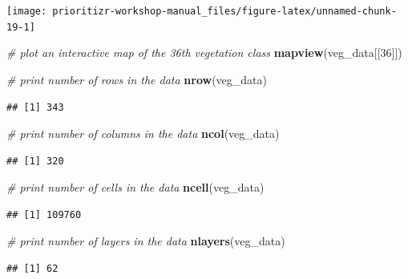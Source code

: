 \documentclass[12pt,]{book}
\newenvironment{Shaded}{\begin{snugshade}}{\end{snugshade}}
\newcommand{\KeywordTok}[1]{\textcolor[rgb]{0.13,0.29,0.53}{\textbf{#1}}}
\newcommand{\DecValTok}[1]{\textcolor[rgb]{0.00,0.00,0.81}{#1}}
\newcommand{\CommentTok}[1]{\textcolor[rgb]{0.56,0.35,0.01}{\textit{#1}}}
\newcommand{\NormalTok}[1]{#1}
\begin{document}
\begin{center}\texttt{[image: prioritizr-workshop-manual\_files/figure-latex/unnamed-chunk-19-1]} \end{center}

\begin{Shaded}
\begin{Highlighting}[]
\CommentTok{# plot an interactive map of the 36th vegetation class}
\KeywordTok{mapview}\NormalTok{(veg_data[[}\DecValTok{36}\NormalTok{]])}
\end{Highlighting}
\end{Shaded}

\begin{Shaded}
\begin{Highlighting}[]
\CommentTok{# print number of rows in the data}
\KeywordTok{nrow}\NormalTok{(veg_data)}
\end{Highlighting}
\end{Shaded}

\begin{verbatim}
## [1] 343
\end{verbatim}

\begin{Shaded}
\begin{Highlighting}[]
\CommentTok{# print number of columns  in the data}
\KeywordTok{ncol}\NormalTok{(veg_data)}
\end{Highlighting}
\end{Shaded}

\begin{verbatim}
## [1] 320
\end{verbatim}

\begin{Shaded}
\begin{Highlighting}[]
\CommentTok{# print number of cells in the data}
\KeywordTok{ncell}\NormalTok{(veg_data)}
\end{Highlighting}
\end{Shaded}

\begin{verbatim}
## [1] 109760
\end{verbatim}

\begin{Shaded}
\begin{Highlighting}[]
\CommentTok{# print number of layers in the data}
\KeywordTok{nlayers}\NormalTok{(veg_data)}
\end{Highlighting}
\end{Shaded}

\begin{verbatim}
## [1] 62
\end{verbatim}
\end{document}
